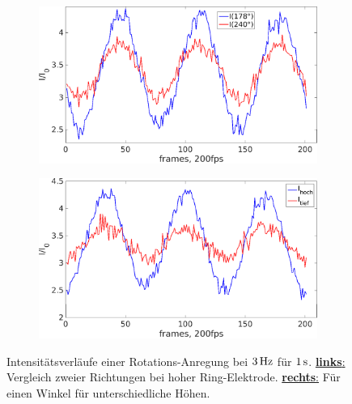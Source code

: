 \documentclass[numbers=noenddot,a4paper]{scrartcl}
\newcommand{\fett}[1]{\textbf{#1}}
\begin{document}
						\begin{figure}[!b]
							\centering
							\begin{subfigure}{0.49\textwidth}
								\centering
								\includegraphics[width=\textwidth,height=0.6\textwidth]{figs/auswertung/intensrotathoch178u2402Hz1sek.png}
							\end{subfigure}
							\begin{subfigure}{0.49\textwidth}
								\centering
								\includegraphics[width=\textwidth,height=0.6\textwidth]{figs/auswertung/intensrotathochutief1783Hz1sek.png}
							\end{subfigure}
							\caption{Intensitätsverläufe einer Rotations-Anregung bei $\unit[3]{Hz}$ für $\unit[1]{s}$. \underline{\fett{links}:} Vergleich zweier Richtungen bei hoher Ring-Elektrode. \underline{\fett{rechts}:} Für einen Winkel für unterschiedliche Höhen.}\label{img:intensrotathochutief}
						\end{figure}
\end{document}

